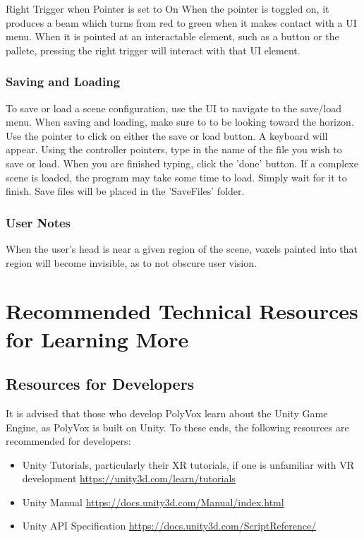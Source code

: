 \documentclass[onecolumn, draftclsnofoot,10pt, compsoc]{IEEEtran}
\newcounter{threesection}[subsubsection]
\begin{document}
Right Trigger when Pointer is set to On When the pointer is toggled on, it produces a beam which turns from red to green when it makes contact with a UI menu.
When it is pointed at an interactable element, such as a button or the pallete, pressing the right trigger will interact with that UI element.

\subsubsection{Saving and Loading}
To save or load a scene configuration, use the UI to navigate to the save/load menu.
When saving and loading, make sure to to be looking toward the horizon.
Use the pointer to click on either the save or load button.
A keyboard will appear.
Using the controller pointers, type in the name of the file you wish to save or load.
When you are finished typing, click the 'done' button.
If a complexe scene is loaded, the program may take some time to load. 
Simply wait for it to finish.
Save files will be placed in the 'SaveFiles' folder.

\subsubsection{User Notes}
When the user's head is near a given region of the scene, voxels painted into that region will become invisible, as to not obscure user vision.



\section{Recommended Technical Resources for Learning More}
\subsection{Resources for Developers}
It is advised that those who develop PolyVox learn about the Unity Game Engine, as PolyVox is built on Unity. To these ends, the following resources are recommended for developers:
\begin{itemize}
\item Unity Tutorials, particularly their XR tutorials, if one is unfamiliar with VR development \url{https://unity3d.com/learn/tutorials}
\item Unity Manual \url{https://docs.unity3d.com/Manual/index.html}
\item Unity API Specification \url{https://docs.unity3d.com/ScriptReference/}
\end{itemize}
\end{document}
